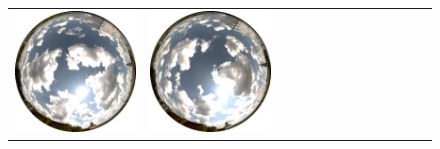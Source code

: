 \documentclass{report}
\begin{document}
\begin{figure}[!th]
\begin{tabular}{@{}rcccccccccccc@{}}
    \includegraphics[width=\customwidth]{./figures/database/20130824_140002.jpg} &
    \includegraphics[width=\customwidth]{./figures/database/20130824_142960.jpg} &

\end{tabular}
\end{figure}
\end{document}
